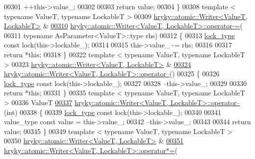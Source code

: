 \begin{DoxyCode}
{00301     ++this->value\_;
00302     
00303     \textcolor{keywordflow}{return} value;
00304 \}
00308 \textcolor{keyword}{template} < \textcolor{keyword}{typename} ValueT, \textcolor{keyword}{typename} LockableT >
00309 \hyperlink{classhryky_1_1atomic_1_1_writer}{hryky::atomic::Writer<ValueT, LockableT>} & 
\hypertarget{atomic__writer_8h_source_l00310}{}\hyperlink{group__atomic__operation_gace0bc7c5e8b6db7afe82e231697672a0}{00310} \hyperlink{classhryky_1_1atomic_1_1_writer}{hryky::atomic::Writer<ValueT, LockableT>::operator-=}(
00311     \textcolor{keyword}{typename} AsParameter<ValueT>::type rhs)
00312 \{
00313     \hyperlink{classhryky_1_1exclusion_1_1_lock}{lock_type} \textcolor{keyword}{const} lock(this->lockable\_);
00314 
00315     this->value\_ -= rhs;
00316     
00317     \textcolor{keywordflow}{return} *\textcolor{keyword}{this};
00318 \}
00322 \textcolor{keyword}{template} < \textcolor{keyword}{typename} ValueT, \textcolor{keyword}{typename} LockableT >
00323 \hyperlink{classhryky_1_1atomic_1_1_writer}{hryky::atomic::Writer<ValueT, LockableT>} & 
\hypertarget{atomic__writer_8h_source_l00324}{}\hyperlink{group__atomic__operation_ga6a2f90286d2b8aef610b7ae4cef1f9e7}{00324} \hyperlink{classhryky_1_1atomic_1_1_writer}{hryky::atomic::Writer<ValueT, LockableT>::operator--}()
00325 \{
00326     \hyperlink{classhryky_1_1exclusion_1_1_lock}{lock_type} \textcolor{keyword}{const} lock(this->lockable\_);
00327 
00328     --this->value\_;
00329 
00330     \textcolor{keywordflow}{return} *\textcolor{keyword}{this};
00331 \}
00335 \textcolor{keyword}{template} < \textcolor{keyword}{typename} ValueT, \textcolor{keyword}{typename} LockableT >
00336 ValueT
\hypertarget{atomic__writer_8h_source_l00337}{}\hyperlink{group__atomic__operation_ga034cdbf5814223426e50001330c6dddd}{00337} \hyperlink{classhryky_1_1atomic_1_1_writer}{hryky::atomic::Writer<ValueT, LockableT>::operator--}(\textcolor{keywordtype}{int})
00338 \{
00339     \hyperlink{classhryky_1_1exclusion_1_1_lock}{lock_type} \textcolor{keyword}{const} lock(this->lockable\_);
00340     
00341     value\_type \textcolor{keyword}{const} value = this->value\_;
00342     --this->value\_;
00343     
00344     \textcolor{keywordflow}{return} value;
00345 \}
00349 \textcolor{keyword}{template} < \textcolor{keyword}{typename} ValueT, \textcolor{keyword}{typename} LockableT >
00350 \hyperlink{classhryky_1_1atomic_1_1_writer}{hryky::atomic::Writer<ValueT, LockableT>} & 
\hypertarget{atomic__writer_8h_source_l00351}{}\hyperlink{group__atomic__operation_ga40b0c967eb60601676828001bef4637c}{00351} \hyperlink{classhryky_1_1atomic_1_1_writer}{hryky::atomic::Writer<ValueT, LockableT>::operator*=}(
}
\end{DoxyCode}
